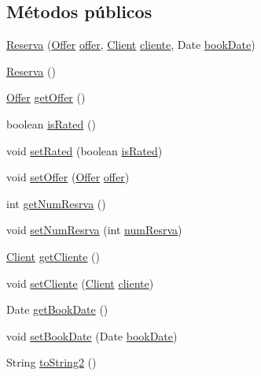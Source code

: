 \subsection*{Métodos públicos}
\begin{DoxyCompactItemize}
\item 
\mbox{\hyperlink{classdomain_1_1_reserva_acb289875e54f0b223b7ab92c47e3ea86}{Reserva}} (\mbox{\hyperlink{classdomain_1_1_offer}{Offer}} \mbox{\hyperlink{classdomain_1_1_reserva_a94a6ee6bd5c3aea150f3977c8a7cf1f0}{offer}}, \mbox{\hyperlink{classdomain_1_1_client}{Client}} \mbox{\hyperlink{classdomain_1_1_reserva_a2e519e6a41cf08679b9c9f6a4540a454}{cliente}}, Date \mbox{\hyperlink{classdomain_1_1_reserva_a6a00db7ede45d4548224d99d8f42256b}{book\+Date}})
\item 
\mbox{\hyperlink{classdomain_1_1_reserva_a920a05fbd4ec288b6f5b8e0b5ad6e345}{Reserva}} ()
\item 
\mbox{\hyperlink{classdomain_1_1_offer}{Offer}} \mbox{\hyperlink{classdomain_1_1_reserva_ad1da3466712c5ccaf43cb6f9fe9f5045}{get\+Offer}} ()
\item 
boolean \mbox{\hyperlink{classdomain_1_1_reserva_a9a1a3d154e412bd3556f95d7dbb56934}{is\+Rated}} ()
\item 
void \mbox{\hyperlink{classdomain_1_1_reserva_a60d958be9830f0e8fd70e2bac91ebc21}{set\+Rated}} (boolean \mbox{\hyperlink{classdomain_1_1_reserva_ad4ad501d339fb6accca9de2122201d04}{is\+Rated}})
\item 
void \mbox{\hyperlink{classdomain_1_1_reserva_addf9b41e3387ad37e88c9ee807b476b0}{set\+Offer}} (\mbox{\hyperlink{classdomain_1_1_offer}{Offer}} \mbox{\hyperlink{classdomain_1_1_reserva_a94a6ee6bd5c3aea150f3977c8a7cf1f0}{offer}})
\item 
int \mbox{\hyperlink{classdomain_1_1_reserva_ad33437c61a742b36c49e5fbf3ae7d715}{get\+Num\+Resrva}} ()
\item 
void \mbox{\hyperlink{classdomain_1_1_reserva_a5477a4cf0cdf65b011a1c6ce51422854}{set\+Num\+Resrva}} (int \mbox{\hyperlink{classdomain_1_1_reserva_a27d9c46e38154c94ce6095a9bd60bbd3}{num\+Resrva}})
\item 
\mbox{\hyperlink{classdomain_1_1_client}{Client}} \mbox{\hyperlink{classdomain_1_1_reserva_ac66925fa2326619705c487e27eef46bb}{get\+Cliente}} ()
\item 
void \mbox{\hyperlink{classdomain_1_1_reserva_a2c7d97df7fcf50e792c841675017abcc}{set\+Cliente}} (\mbox{\hyperlink{classdomain_1_1_client}{Client}} \mbox{\hyperlink{classdomain_1_1_reserva_a2e519e6a41cf08679b9c9f6a4540a454}{cliente}})
\item 
Date \mbox{\hyperlink{classdomain_1_1_reserva_a76865b5232d8cd5e282083b32359dbc6}{get\+Book\+Date}} ()
\item 
void \mbox{\hyperlink{classdomain_1_1_reserva_ab31aa9624b551e748e01a461c8e6030e}{set\+Book\+Date}} (Date \mbox{\hyperlink{classdomain_1_1_reserva_a6a00db7ede45d4548224d99d8f42256b}{book\+Date}})
\item 
String \mbox{\hyperlink{classdomain_1_1_reserva_a67f6dd7c4aee04c6e45e2d22b59c5b2f}{to\+String2}} ()
\end{DoxyCompactItemize}

